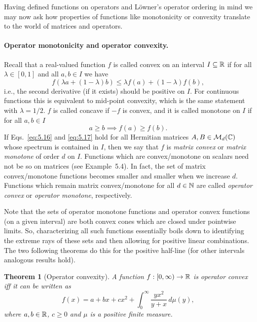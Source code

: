 \documentclass[11pt,a4paper]{article}
\theoremstyle{plain}
\newtheorem{theorem}{Theorem}[section]
\theoremstyle{definition}
\theoremstyle{remark}
\numberwithin{equation}{section}
\begin{document}
Having defined functions on operators and L\"owner's operator ordering in mind we
may now ask how properties of functions like monotonicity or convexity translate to
the world of matrices and operators.

\paragraph{Operator monotonicity and operator convexity.}
Recall that a real-valued function $f$ is called convex on an interval $I\subseteq \mathbb{R}$
if for all $\lambda \in [0,1]$ and all $a,b\in I$ we have
\begin{equation}\label{eq:5.16}
    f(\lambda a + (1-\lambda)b) \le \lambda f(a) + (1-\lambda)f(b),
\end{equation}
i.e., the second derivative (if it exists) should be positive on $I$. For continuous
functions this is equivalent to mid-point convexity, which is the same statement with
$\lambda=1/2$. $f$ is called concave if $-f$ is convex, and it is called monotone on
$I$ if for all $a,b\in I$
\begin{equation}\label{eq:5.17}
    a\ge b \implies f(a)\ge f(b).
\end{equation}
If Eqs.~\eqref{eq:5.16} and \eqref{eq:5.17} hold for all Hermitian matrices
$A,B\in \mathcal{M}_d(\mathbb{C})$ whose spectrum is contained in $I$, then we say that $f$ is
\emph{matrix convex} or \emph{matrix monotone} of order $d$ on $I$. Functions which
are convex/monotone on scalars need not be so on matrices (see Example~5.4). In fact,
the set of matrix convex/monotone functions becomes smaller and smaller when we
increase $d$. Functions which remain matrix convex/monotone for all $d\in \mathbb{N}$ are
called \emph{operator convex} or \emph{operator monotone}, respectively.

Note that the sets of operator monotone functions and operator convex functions (on a
given interval) are both convex cones which are closed under pointwise limits. So,
characterizing all such functions essentially boils down to identifying the extreme
rays of these sets and then allowing for positive linear combinations. The two
following theorems do this for the positive half-line (for other intervals analogous
results hold).

\begin{theorem}[Operator convexity]
    A function $f:[0,\infty)\to \mathbb{R}$ is operator convex iff it can be written as
    \begin{equation}\label{eq:5.18}
        f(x) = a + bx + cx^2 + \int_0^\infty \frac{y x^2}{y+x}\, d\mu(y),
    \end{equation}
    where $a,b\in \mathbb{R}$, $c\ge 0$ and $\mu$ is a positive finite measure.
\end{theorem}
\end{document}

